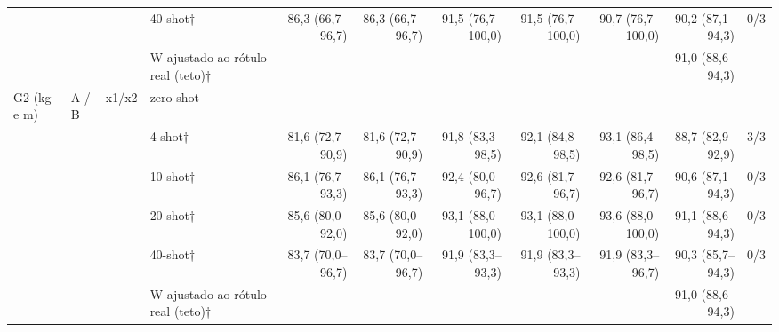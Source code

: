 \begin{table}[htbp]
\begin{tabular}{llllrrrrrrc}
 &  &  & 40-shot† & 86,3 (66,7–96,7) & 86,3 (66,7–96,7) & 91,5 (76,7–100,0) & 91,5 (76,7–100,0) & 90,7 (76,7–100,0) & 90,2 (87,1–94,3) & 0/3 \\
 &  &  & W ajustado ao rótulo real (teto)† & — & — & — & — & — & 91,0 (88,6–94,3) & — \\
\midrule
G2 (kg e m) & A / B & x1/x2 & zero-shot & — & — & — & — & — & — & — \\
 &  &  & 4-shot† & 81,6 (72,7–90,9) & 81,6 (72,7–90,9) & 91,8 (83,3–98,5) & 92,1 (84,8–98,5) & 93,1 (86,4–98,5) & 88,7 (82,9–92,9) & 3/3 \\
 &  &  & 10-shot† & 86,1 (76,7–93,3) & 86,1 (76,7–93,3) & 92,4 (80,0–96,7) & 92,6 (81,7–96,7) & 92,6 (81,7–96,7) & 90,6 (87,1–94,3) & 0/3 \\
 &  &  & 20-shot† & 85,6 (80,0–92,0) & 85,6 (80,0–92,0) & 93,1 (88,0–100,0) & 93,1 (88,0–100,0) & 93,6 (88,0–100,0) & 91,1 (88,6–94,3) & 0/3 \\
 &  &  & 40-shot† & 83,7 (70,0–96,7) & 83,7 (70,0–96,7) & 91,9 (83,3–93,3) & 91,9 (83,3–93,3) & 91,9 (83,3–96,7) & 90,3 (85,7–94,3) & 0/3 \\
 &  &  & W ajustado ao rótulo real (teto)† & — & — & — & — & — & 91,0 (88,6–94,3) & — \\
\bottomrule

\end{tabular}
\end{table}
